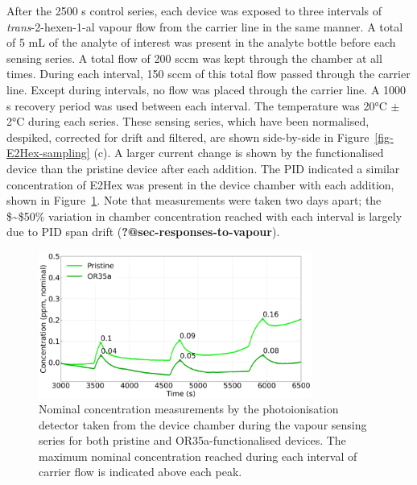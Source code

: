 \documentclass[
  a4paper,
]{scrbook}
\begin{document}
After the 2500 s control series, each device was exposed to three
intervals of \emph{trans}-2-hexen-1-al vapour flow from the carrier line
in the same manner. A total of 5 mL of the analyte of interest was
present in the analyte bottle before each sensing series. A total flow
of 200 sccm was kept through the chamber at all times. During each
interval, 150 sccm of this total flow passed through the carrier line.
Except during intervals, no flow was placed through the carrier line. A
1000 s recovery period was used between each interval. The temperature
was 20°C \(\pm\) 2°C during each series. These sensing series, which
have been normalised, despiked, corrected for drift and filtered, are
shown side-by-side in Figure~\ref{fig-E2Hex-sampling} (c). A larger
current change is shown by the functionalised device than the pristine
device after each addition. The PID indicated a similar concentration of
E2Hex was present in the device chamber with each addition, shown in
Figure~\ref{fig-E2Hex-additions-PID}. Note that measurements were taken
two days apart; the \$\sim\$50\% variation in chamber concentration
reached with each interval is largely due to PID span drift
(\textbf{?@sec-responses-to-vapour}).

\begin{figure}

{\centering \includegraphics[width=0.8\textwidth,height=\textheight]{figures/ch8/input_time_comparison.png}

}

\caption{\label{fig-E2Hex-additions-PID}Nominal concentration
measurements by the photoionisation detector taken from the device
chamber during the vapour sensing series for both pristine and
OR35a-functionalised devices. The maximum nominal concentration reached
during each interval of carrier flow is indicated above each peak.}

\end{figure}
\end{document}
